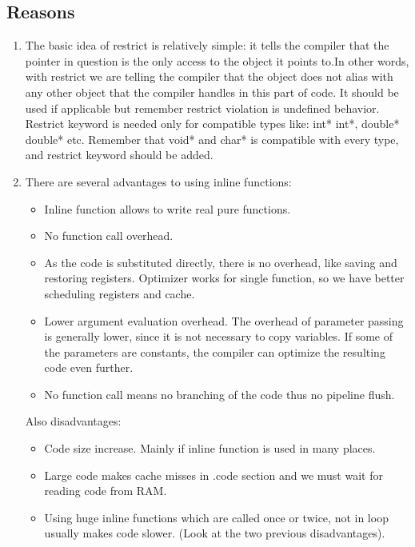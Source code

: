 \subsection{Reasons}
\begin{enumerate}
    \item The basic idea of restrict is relatively simple: it tells the compiler that the pointer in question is the only access to the object it points to.In other words, with restrict we are telling the compiler that the object does not alias with any other object that the compiler handles in this part of code. It should be used if applicable but remember restrict violation is undefined behavior. Restrict keyword is needed only for compatible types like: int* int*, double* double* etc. Remember that void* and char* is compatible with every type, and restrict keyword should be added.
    \item There are several advantages to using inline functions:
        \begin{itemize}
            \item Inline function allows to write real pure functions.
            \item No function call overhead.
            \item As the code is substituted directly, there is no overhead, like saving and restoring registers. Optimizer works for single function, so we have better scheduling registers and cache.
            \item Lower argument evaluation overhead. The overhead of parameter
            passing is generally lower, since it is not necessary to copy variables. If
            some of the parameters are constants, the compiler can optimize the
            resulting code even further.
            \item No function call means no branching of the code thus no pipeline flush.
        \end{itemize}
        Also disadvantages:
        \begin{itemize}
            \item Code size increase. Mainly if inline function is used in many places.
            \item Large code makes cache misses in .code section and we must wait for reading code from RAM.
            \item Using huge inline functions which are called once or twice, not in loop usually makes code slower. (Look at the two previous disadvantages).
        \end{itemize}

\end{enumerate}
